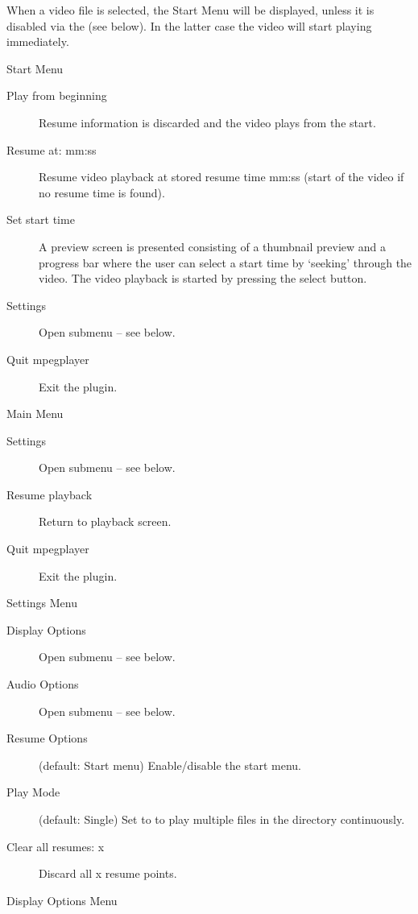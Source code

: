 When a video file is selected, the Start Menu will be displayed, unless it is 
disabled via the  (see below). In the latter case the video 
will start playing immediately.

Start Menu

\begin{description}
\item[Play from beginning] Resume information is discarded and the video plays
    from the start.
\item[Resume at: mm:ss] Resume video playback at stored resume time mm:ss
    (start of the video if no resume time is found).
\item[Set start time] A preview screen is presented consisting of a
    thumbnail preview and a progress bar where the user can select a start time
    by `seeking' through the video. The video playback is started by pressing
    the select button.
\item[Settings] Open  submenu -- see below.
\item[Quit mpegplayer] Exit the plugin.
\end{description}

Main Menu

\begin{description}
\item[Settings] Open  submenu -- see below.
\item[Resume playback] Return to playback screen.
\item[Quit mpegplayer] Exit the plugin.
\end{description}

Settings Menu

\begin{description}
\item[Display Options] Open  submenu -- see below.
\item[Audio Options] Open  submenu -- see below.
\item[Resume Options] (default: Start menu) Enable/disable the start menu.
\item[Play Mode] (default: Single) Set to  to play multiple
     files in the directory continuously.
\item[Clear all resumes: x] Discard all x resume points.
\end{description}

Display Options Menu

